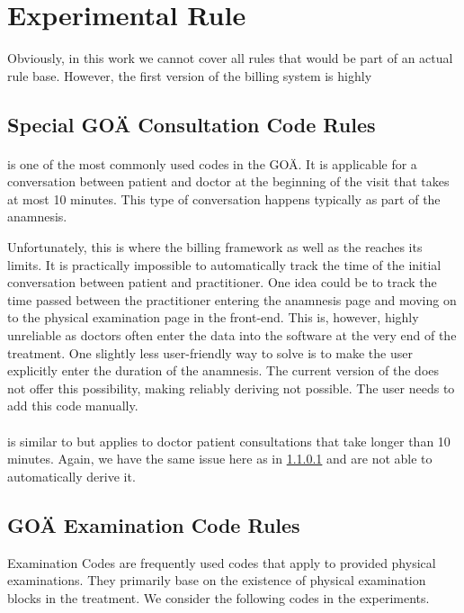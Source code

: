 \section{Experimental Rule}\label{sec:experimental-rule-base}
Obviously, in this work we cannot cover all rules that would be part of an actual rule base.
However, the first version of the billing system is highly


\subsection{Special GOÄ Consultation Code Rules}\label{subsec:special-consultation-code-rules}

\paragraph{}\label{par:goa-1}
 is one of the most commonly used codes in the GOÄ.
It is applicable for a conversation between patient and doctor at the beginning of the visit that takes at most 10 minutes.
This type of conversation happens typically as part of the anamnesis.

Unfortunately, this is where the billing framework as well as the \AVS reaches its limits.
It is practically impossible to automatically track the time of the initial conversation between patient and practitioner.
One idea could be to track the time passed between the practitioner entering the anamnesis page and moving on to the physical examination page in the front-end.
This is, however, highly unreliable as doctors often enter the data into the software at the very end of the treatment.
One slightly less user-friendly way to solve is to make the user explicitly enter the duration of the anamnesis.
The current version of the \AVS does not offer this possibility, making reliably deriving  not possible.
The user needs to add this code manually.

\paragraph{}
 is similar to  but applies to doctor patient consultations that take longer than 10 minutes.
Again, we have the same issue here as in \ref{par:goa-1} and are not able to automatically derive it.

\subsection{GOÄ Examination Code Rules}\label{subsec:examination-code-rules}
Examination Codes are frequently used codes that apply to provided physical examinations.
They primarily base on the existence of physical examination blocks in the treatment.
We consider the following codes in the experiments.

